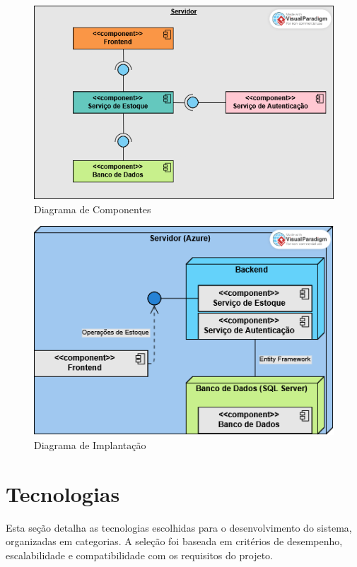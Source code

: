 \documentclass[
	12pt,				%
	openany,			%
	twoside,			%
	a4paper,			%
	english,			%
	brazil				%
	]{abntex2}
\begin{document}
\begin{figure}[h!]
    \centering
\includegraphics[width=1.0\textwidth]{Figuras/Componentes.png}
    \caption{Diagrama de Componentes}
\end{figure}

\begin{figure}[h!]
    \centering
\includegraphics[width=1.0\textwidth]{Figuras/Implantação.png}
    \caption{Diagrama de Implantação}
\end{figure}



\FloatBarrier


\section{Tecnologias}

Esta seção detalha as tecnologias escolhidas para o desenvolvimento do sistema, organizadas em categorias. A seleção foi baseada em critérios de desempenho, escalabilidade e compatibilidade com os requisitos do projeto.
\end{document}
